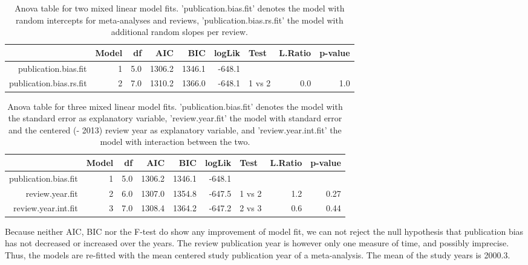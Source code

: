 \documentclass[11pt,a4paper,twoside]{book}\usepackage[]{graphicx}\usepackage[]{color}
\begin{document}
\begin{table}[ht]
\centering
\begingroup\scriptsize
\begin{tabular}{rrrrrrlrr}
  \hline
 & Model & df & AIC & BIC & logLik & Test & L.Ratio & p-value \\ 
  \hline
publication.bias.fit &  1 & 5.0 & 1306.2 & 1346.1 & -648.1 &  &  &  \\ 
  publication.bias.rs.fit &  2 & 7.0 & 1310.2 & 1366.0 & -648.1 & 1 vs 2 & 0.0 & 1.0 \\ 
   \hline
\end{tabular}
\endgroup
\caption{Anova table for two mixed linear model fits. 'publication.bias.fit' denotes the model with random intercepts for meta-analyses and reviews, 'publication.bias.rs.fit' the model with additional random slopes per review.} 
\label{anova.random.slopes}
\end{table}





\begin{table}[ht]
\centering
\begingroup\scriptsize
\begin{tabular}{rrrrrrlrr}
  \hline
 & Model & df & AIC & BIC & logLik & Test & L.Ratio & p-value \\ 
  \hline
publication.bias.fit &  1 & 5.0 & 1306.2 & 1346.1 & -648.1 &  &  &  \\ 
  review.year.fit &  2 & 6.0 & 1307.0 & 1354.8 & -647.5 & 1 vs 2 & 1.2 & 0.27 \\ 
  review.year.int.fit &  3 & 7.0 & 1308.4 & 1364.2 & -647.2 & 2 vs 3 & 0.6 & 0.44 \\ 
   \hline
\end{tabular}
\endgroup
\caption{Anova table for three mixed linear model fits. 'publication.bias.fit' denotes the model with the standard error as explanatory variable, 'review.year.fit' the model with standard error and the centered (- 2013) review year as explanatory variable, and 'review.year.int.fit' the model with interaction between the two.} 
\label{anova.lme}
\end{table}


Because neither AIC, BIC nor the F-test do show any improvement of model fit, we can not reject the null hypothesis that publication bias has not decreased or increased over the years. The review publication year is however only one measure of time, and possibly imprecise. Thus, the models are re-fitted with the mean centered study publication year of a meta-analysis. The mean of the study years is 2000.3.
\end{document}
